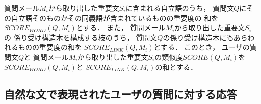   質問メール$M_{i}$から取り出した重要文$S_{i}$に含まれる自立語のうち，
  質問文$Q$にその自立語そのものかその同義語が含まれているものの重要度の
  和を$SCORE_{WORD} (Q, M_{i})$とする．
  また，
  質問メール$M_{i}$から取り出した重要文$S_{i}$の
  係り受け構造木を構成する枝のうち，
  質問文$Q$の係り受け構造木にもあらわれるものの重要度の和を
  $SCORE_{LINK} (Q, M_{i})$とする．
  このとき，
  ユーザの質問文$Q$と
  質問メール$M_{i}$から取り出した重要文$S_{i}$の類似度$SCORE(Q, M_{i})$を
  $SCORE_{WORD} (Q, M_{i})$と
  $SCORE_{LINK} (Q, M_{i})$の和とする．


 \subsection{自然な文で表現されたユーザの質問に対する応答}
 \label{subsec:自然な文で表現されたユーザの質問に対する応答}

